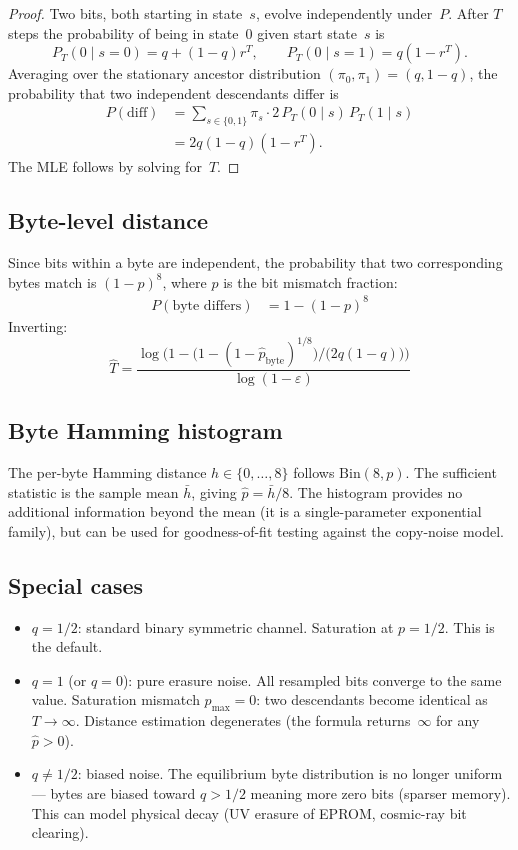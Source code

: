 \documentclass[11pt]{article}
\begin{document}
\begin{proof}
Two bits, both starting in state~$s$, evolve independently under~$P$.
After $T$ steps the probability of being in state~0 given start
state~$s$ is
\[
P_T(0 \mid s=0) = q + (1-q) r^T, \qquad
P_T(0 \mid s=1) = q(1 - r^T).
\]
Averaging over the stationary ancestor distribution
$(\pi_0, \pi_1) = (q, 1-q)$, the probability that two independent
descendants differ is
\begin{align*}
P(\text{diff})
&= \sum_{s \in \{0,1\}} \pi_s \cdot 2\, P_T(0 \mid s)\, P_T(1 \mid s) \\
&= 2q(1-q)(1 - r^T).
\end{align*}
The MLE follows by solving for~$T$.
\end{proof}

\subsection{Byte-level distance}

Since bits within a byte are independent, the probability that two
corresponding bytes match is $(1-p)^8$, where $p$ is the bit mismatch
fraction:
\begin{align}
P(\text{byte differs}) &= 1 - (1-p)^8
\end{align}
Inverting:
\begin{equation}
\hat{T} = \frac{\log\bigl(1 - \bigl(1-(1-\hat{p}_{\text{byte}})^{1/8}\bigr)\big/\bigl(2q(1-q)\bigr)\bigr)}{\log(1-\varepsilon)}
\end{equation}

\subsection{Byte Hamming histogram}

The per-byte Hamming distance $h \in \{0,\ldots,8\}$ follows
$\mathrm{Bin}(8, p)$. The sufficient statistic is the sample mean
$\bar{h}$, giving $\hat{p} = \bar{h}/8$. The histogram provides no
additional information beyond the mean (it is a single-parameter
exponential family), but can be used for goodness-of-fit testing
against the copy-noise model.

\subsection{Special cases}

\begin{itemize}
\item $q = 1/2$: standard binary symmetric channel. Saturation at
  $p = 1/2$. This is the default.
\item $q = 1$ (or $q = 0$): pure erasure noise. All resampled bits
  converge to the same value. Saturation mismatch $p_{\max} = 0$:
  two descendants become identical as $T \to \infty$. Distance
  estimation degenerates (the formula returns~$\infty$ for any
  $\hat{p} > 0$).
\item $q \neq 1/2$: biased noise. The equilibrium byte distribution
  is no longer uniform --- bytes are biased toward $q > 1/2$ meaning
  more zero bits (sparser memory). This can model physical decay
  (UV erasure of EPROM, cosmic-ray bit clearing).
\end{itemize}
\end{document}
